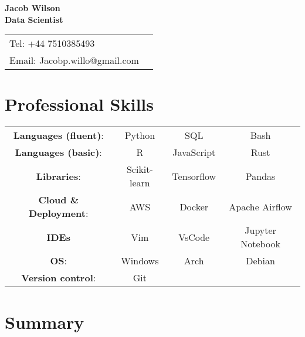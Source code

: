 \documentclass[10pt]{article}
\begin{document}
\linespread{1.0}



{\center
{\Large\bf Jacob Wilson \\ Data Scientist \vspace{0.1in} }

\begin{center} 
\begin{tabular*}{1.0\textwidth}%
   {@{\extracolsep{\fill}}lr}
	Tel:   +44 7510385493\\
	Email: Jacobp.willo@gmail.com \\
\end{tabular*}
\end{center}


\addtolength{\itemsep}{-1ex} \addtolength{\topsep}{-1.5ex}


\section*{\bf  Professional Skills}
\begin{center}
\begin{tabular}{c c c c}
{\bf Languages (fluent)}: & Python & SQL & Bash\\
{\bf Languages (basic)}: &  R & JavaScript & Rust\\
{\bf Libraries}:  & Scikit-learn & Tensorflow & Pandas \\
{\bf Cloud \& Deployment}: & AWS & Docker & Apache Airflow\\
{\bf IDEs} & Vim & VsCode & Jupyter Notebook \\
{\bf OS}: & Windows & Arch & Debian \\
{\bf Version control}: & Git

\end{tabular}
\end{center}


\section*{\bf Summary}

}
\end{document}
